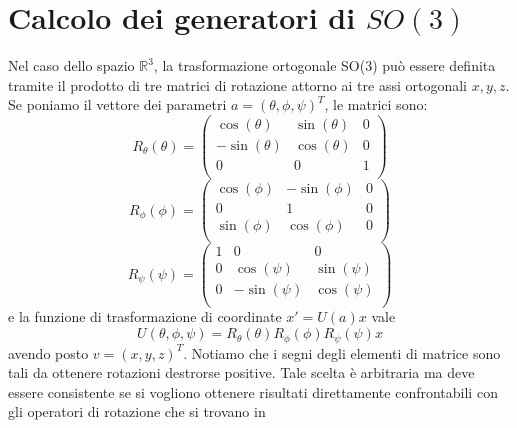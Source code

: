 \documentclass[fleqn,italian]{article}
\theoremstyle{definition}
\theoremstyle{remark}
\theoremstyle{plain}%
\theoremstyle{definition}
\theoremstyle{remark}
\numberwithin{equation}{section}
\numberwithin{thm}{section}
\begin{document}
\section{Calcolo dei generatori di $SO(3)$}

Nel caso dello spazio $\mathbb{R}^3$, la trasformazione ortogonale
SO(3) pu\`o essere definita tramite il prodotto di tre matrici di 
rotazione attorno ai tre assi ortogonali $x,y,z$. Se poniamo il 
vettore dei parametri $a=(\theta,\phi,\psi)^T$, le matrici sono:
\begin{equation}
R_\theta(\theta)=\begin{pmatrix} \cos(\theta) & \sin(\theta) & 0 \\
                                -\sin(\theta) & \cos(\theta) & 0 \\
                                       0      &       0      & 1 \\
                 \end{pmatrix}
\end{equation}
\begin{equation}
R_\phi(\phi)=\begin{pmatrix} \cos(\phi) & -\sin(\phi) & 0 \\
                                 0      &     1       & 0 \\
                             \sin(\phi) & \cos(\phi)  & 0 \\
                 \end{pmatrix}
\end{equation}
\begin{equation}
R_\psi(\psi)=\begin{pmatrix} 1  &      0      &      0     \\
                             0  & \cos(\psi)  & \sin(\psi) \\
                             0  & -\sin(\psi) & \cos(\psi) \\
                 \end{pmatrix}
\end{equation}
e la funzione di trasformazione di coordinate $x'=U(a)x$ vale 
\begin{equation}
U(\theta,\phi,\psi)=R_\theta(\theta)R_\phi(\phi)R_\psi(\psi)x
\end{equation}
avendo posto $v=(x,y,z)^T$. Notiamo che i segni degli elementi di
matrice sono tali da ottenere rotazioni destrorse positive. Tale scelta
\`e arbitraria ma deve essere consistente se si vogliono ottenere risultati
direttamente confrontabili con gli operatori di rotazione che si trovano in
\end{document}
